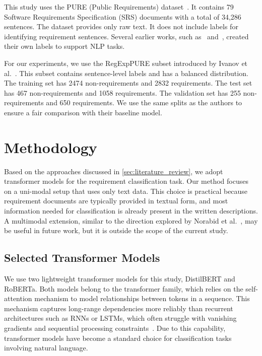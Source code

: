 \documentclass[sigconf,review]{acmart}
\begin{document}
This study uses the PURE (Public Requirements) dataset~\cite{ferrari2017pure}. It contains 79 Software Requirements Specification (SRS) documents with a total of 34,286 sentences. The dataset provides only raw text. It does not include labels for identifying requirement sentences. Several earlier works, such as~\cite{ivanov2021regexppure} and~\cite{siahaan2022novel}, created their own labels to support NLP tasks.

For our experiments, we use the RegExpPURE subset introduced by Ivanov et al.~\cite{ivanov2021regexppure}. This subset contains sentence-level labels and has a balanced distribution. The training set has 2474 non-requirements and 2832 requirements. The test set has 467 non-requirements and 1058 requirements. The validation set has 255 non-requirements and 650 requirements. We use the same splits as the authors to ensure a fair comparison with their baseline model.



\section{Methodology}
\label{sec:methodology}

Based on the approaches discussed in \autoref{sec:literature_review}, we adopt transformer models for the requirement classification task. Our method focuses on a uni-modal setup that uses only text data. This choice is practical because requirement documents are typically provided in textual form, and most information needed for classification is already present in the written descriptions. A multimodal extension, similar to the direction explored by Norabid et al.~\cite{norabid2022rule}, may be useful in future work, but it is outside the scope of the current study.


\subsection{Selected Transformer Models}

We use two lightweight transformer models for this study, DistilBERT and RoBERTa. Both models belong to the transformer family, which relies on the self-attention mechanism to model relationships between tokens in a sequence. This mechanism captures long-range dependencies more reliably than recurrent architectures such as RNNs or LSTMs, which often struggle with vanishing gradients and sequential processing constraints~\cite{vaswani2017attention}. Due to this capability, transformer models have become a standard choice for classification tasks involving natural language.
\end{document}
